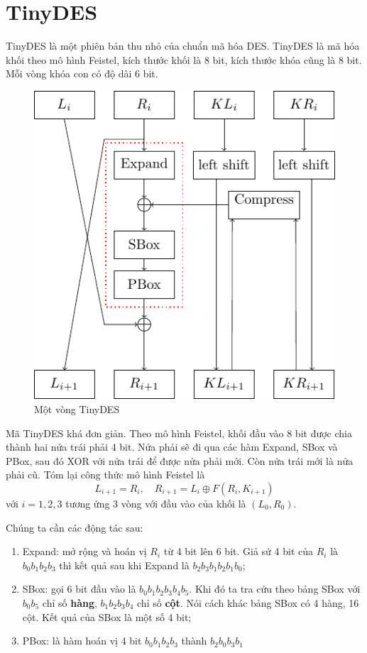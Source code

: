 \chapter{TinyDES}

TinyDES là một phiên bản thu nhỏ của chuẩn mã hóa DES. TinyDES
là mã hóa khối theo mô hình Feistel, kích thước khối là 8 bit, kích
thước khóa cũng là 8 bit. Mỗi vòng khóa con có độ dài 6 bit.

\begin{figure}[ht]
    \centering
    \includegraphics{../pics/tinydes/blocky.pdf}
    \caption{Một vòng TinyDES}
\end{figure}

Mã TinyDES khá đơn giản. Theo mô hình Feistel, khối đầu vào 8 bit được chia thành
hai nửa trái phải 4 bit. Nửa phải sẽ đi qua các hàm Expand, SBox và PBox, sau đó
XOR với nửa trái để được nửa phải mới. Còn nửa trái mới là nửa phải cũ. Tóm lại 
công thức mô hình Feistel là
\[L_{i+1} = R_i, \quad R_{i+1} = L_i \oplus F(R_i, K_{i+1})\]
với $i = 1, 2, 3$ tương ứng 3 vòng với đầu vào của khối là $(L_0, R_0)$.

Chúng ta cần các động tác sau:

\begin{enumerate}
    \item Expand: mở rộng và hoán vị $R_i$ từ 4 bit lên 6 bit. Giả sử 4 bit
    của $R_i$ là $b_0 b_1 b_2 b_3$ thì kết quả sau khi Expand là $b_2 b_3 b_1
    b_2 b_1 b_0$;
    \item SBox: gọi 6 bit đầu vào là $b_0 b_1 b_2 b_3 b_4 b_5$. Khi đó ta tra
    cứu theo bảng SBox với $b_0 b_5$ chỉ số \textbf{hàng}, $b_1 b_2 b_3 b_4$ chỉ
    số \textbf{cột}. Nói cách khác bảng SBox có 4 hàng, 16 cột. Kết quả của SBox
    là một số 4 bit;
    \item PBox: là hàm hoán vị 4 bit $b_0 b_1 b_2 b_3$ thành $b_2 b_0 b_3 b_1$
\end{enumerate}


